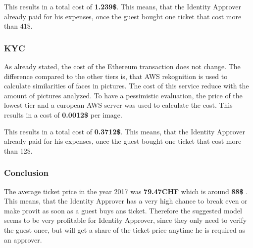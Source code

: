 This results in a total cost of \textbf{1.239\$}. This means, that the Identity Approver already paid for his expenses, once the guest bought one ticket that cost more than 41\$. 

\subsubsection{KYC}
As already stated, the cost of the Ethereum transaction does not change. The difference compared to the other tiers is, that AWS rekognition is used to calculate similarities of faces in pictures. The cost of this service reduce with the amount of pictures analyzed. To have a pessimistic evaluation, the price of the lowest tier and a european AWS server was used to calculate the cost. This results in a cost of \textbf{0.0012\$} per image\cite{AWS-Cost}.

This results in a total cost of \textbf{0.3712\$}. This means, that the Identity Approver already paid for his expenses, once the guest bought one ticket that cost more than 12\$. 

\subsubsection{Conclusion}
The average ticket price in the year 2017 was \textbf{79.47CHF} which is around\textbf{ 88\$} \cite{Ticket-Price}. This means, that the Identity Approver has a very high chance to break even or make provit as soon as a guest buys ans ticket. Therefore the suggested model seems to be very profitable for Identity Approver, since they only need to verify the guest once, but will get a share of the ticket price anytime he is required as an approver. 

